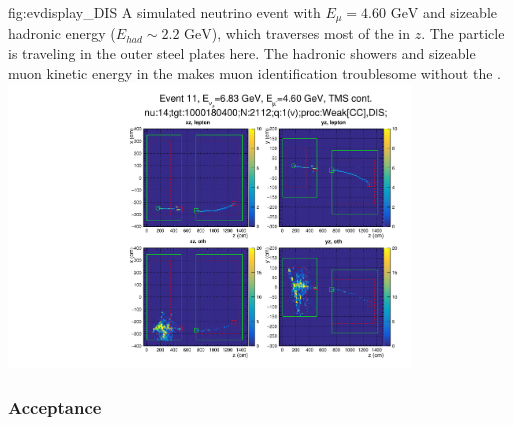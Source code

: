 
\begin{dunefigure}{fig:evdisplay_DIS}
{A simulated neutrino  event with $E_\mu=4.60\text{ GeV}$ and sizeable hadronic energy ($E_{had}\sim2.2\text{ GeV}$), which traverses most of the  in $z$. The particle is traveling in the outer steel plates here. The hadronic showers and sizeable muon kinetic energy in the  makes muon identification troublesome without the .}
\includegraphics[trim=0 0 0 55, clip,width=0.8\textwidth]{graphics/tms/Simulation/EventDisplay/pg_0001.pdf}
\end{dunefigure}

\clearpage

\subsubsection{Acceptance}

